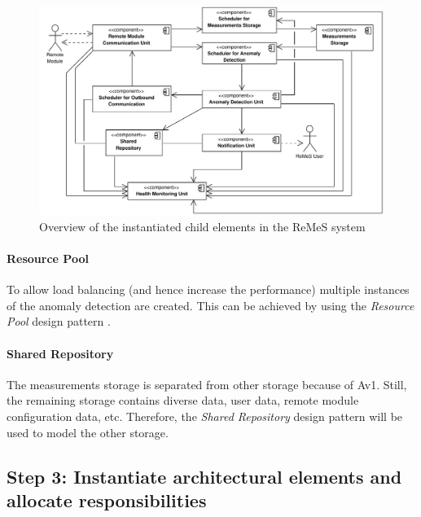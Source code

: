\begin{figure}[H]
	\begin{centering}
		\includegraphics[width=1.2\textwidth,angle=90]{figs/add-it1-elements.pdf}
		\caption{Overview of the instantiated child elements in the ReMeS system}
		\label{fig:it1/elements}
	\end{centering}
\end{figure}

\paragraph{Resource Pool}

\npar To allow load balancing (and hence increase the performance) multiple
instances of the anomaly detection are created. This can be achieved by using
the \emph{Resource Pool} design pattern \citep[see][p.~503]{Buschmann:07}. 

\paragraph{Shared Repository}

\npar The measurements storage is separated from other storage because of Av1.
Still, the remaining storage contains diverse data, user data, remote module
configuration data, etc. Therefore, the \emph{Shared Repository} design pattern
\citep[see][p.~202]{Buschmann:07} will be used to model the other storage.

\subsection{Step 3: Instantiate architectural elements and allocate responsibilities}
\label{add:it1/elements}

